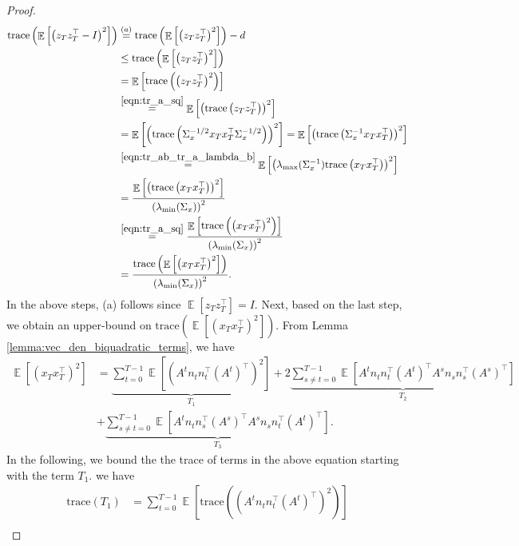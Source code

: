 \documentclass[letterpaper, 11 pt]{article}
\newcommand{\tr}[1]{\text{trace}\left( #1 \right)}
\DeclareMathOperator{\E}{\mathbb{E}}
\begin{document}
\begin{proof}
    \begin{align}
        \tr{\E\left[\left(z_T z_T^{\top} - I\right)^2\right]} & \overset{(a)}{=} \tr{\E\left[\left(z_T z_T^{\top}\right)^2\right]} - d \nonumber\\
        & \leq \tr{\E\left[\left(z_T z_T^{\top}\right)^2\right]} \nonumber\\
        & = \E\left[\tr{\left(z_T z_T^{\top}\right)^2}\right] \nonumber\\
        & \overset{\eqref{eqn:tr_a_sq}}{=} \E\left[\left(\tr{z_T z_T^{\top}}\right)^2\right] \nonumber\\
        & = \E\left[\left(\tr{\Sigma_x^{-1/2}x_T x_T^{\top}\Sigma_x^{-1/2}}\right)^2\right] = \E\left[\left(\tr{\Sigma_x^{-1}x_T x_T^{\top}}\right)^2\right] \nonumber\\
        &  \overset{\eqref{eqn:tr_ab_tr_a_lambda_b}}{=} \E\left[ \left( \lambda_{\max}{(\Sigma_x^{-1})}\tr{x_T x_T^{\top}}\right)^2\right] \nonumber\\
        & = \frac{\E\left[ \left(\tr{x_T x_T^{\top}}\right)^2\right]}{\left(\lambda_{\min}{(\Sigma_x)}\right)^2} \nonumber\\
        & \overset{\eqref{eqn:tr_a_sq}}{=} \frac{\E\left[\tr{\left(x_T x_T^{\top}\right)^2}\right]}{\left(\lambda_{\min}{(\Sigma_x)}\right)^2} \nonumber\\
        & = \frac{\tr{\E\left[\left(x_T x_T^{\top}\right)^2\right]}}{\left(\lambda_{\min}{(\Sigma_x)}\right)^2}.\label{eqn:vec_den_trace_bound}
    \end{align}
    In the above steps, (a) follows since $\E\left[z_T z_T^{\top}\right] = I$. Next, based on the last step, we obtain an upper-bound on $\tr{\E\left[\left(x_T x_T^{\top}\right)^2\right]}$. From Lemma \ref{lemma:vec_den_biquadratic_terms}, we have
     \begin{align}
    \E\left[(x_Tx_T^{\top})^2\right] &= \underbrace{\sum_{t=0}^{T-1} \E\left[(A^tn_tn_t^{\top}(A^t)^{\top})^2\right]}_{T_1}
         + 2\underbrace{\sum_{s\neq t=0}^{T-1} \E\left[ A^tn_tn_t^{\top}(A^t)^{\top} A^sn_sn_s^{\top}(A^s)^{\top}\right]}_{T_2} \nonumber\\ 
         &+ \underbrace{\sum_{s\neq t=0}^{T-1} \E\left[ A^tn_tn_s^{\top}(A^s)^{\top} A^sn_sn_t^{\top}(A^t)^{\top}\right]}_{T_3}. 
         \label{eqn:vec_den_t1_t2_t3} 
    \end{align}
In the following, we bound the the trace of terms in the above equation starting with the term $T_1$. we have
\begin{align}
    \tr{T_1} &= \sum_{t=0}^{T-1} \E\left[\tr{(A^tn_tn_t^{\top}(A^t)^{\top})^2}\right] \nonumber\\

\end{align}
\end{proof}
\end{document}
